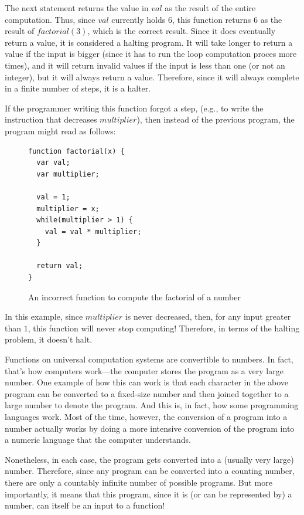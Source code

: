 The next statement returns the value in $val$ as the result of the entire computation.  Thus, since $val$ currently holds $6$, this function returns $6$ as the result of $factorial(3)$, which is the correct result.  Since it does eventually return a value, it is considered a halting program.  It will take longer to return a value if the input is bigger (since it has to run the loop computation proces more times), and it will return invalid values if the input is less than one (or not an integer), but it will always return a value.  Therefore, since it will always complete in a finite number of steps, it is a halter.

If the programmer writing this function forgot a step, (e.g., to write the instruction that decreases $multiplier$), then instead of the previous program, the program might read as follows:

\begin{figure}[H]
\begin{mdframed}
\begin{verbatim}
function factorial(x) {
  var val;
  var multiplier;

  val = 1;
  multiplier = x;
  while(multiplier > 1) {
    val = val * multiplier;
  }

  return val;
}
\end{verbatim}
\end{mdframed}
\caption{An incorrect function to compute the factorial of a number}
\end{figure}

In this example, since $multiplier$ is never decreased, then, for any input greater than $1$, this function will never stop computing!  Therefore, in terms of the halting problem, it doesn't halt.

Functions on universal computation systems are convertible to numbers.  In fact, that's how computers work---the computer stores the program as a very large number.  One example of how this can work is that each character in the above program can be converted to a fixed-size number and then joined together to a large number to denote the program.  And this is, in fact, how some programming languages work.  Most of the time, however, the conversion of a program into a number actually works by doing a more intensive conversion of the program into a numeric language that the computer understands.  

Nonetheless, in each case, the program gets converted into a (usually very large) number.  Therefore, since any program can be converted into a counting number, there are only a countably infinite number of possible programs.  But more importantly, it means that this program, since it is (or can be represented by) a number, can itself be an input to a function!

